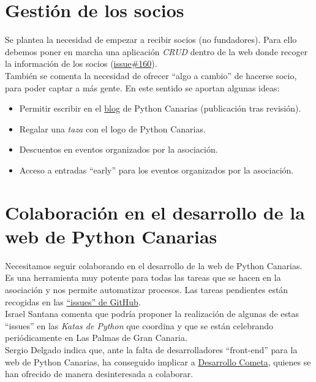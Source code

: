 \documentclass[a4paper, 12pt]{article}
\begin{document}
\section{Gestión de los socios}

Se plantea la necesidad de empezar a recibir socios (no fundadores). Para ello debemos poner en marcha una aplicación \textit{CRUD} dentro de la web donde recoger la información de los socios (\href{https://github.com/pythoncanarias/web/issues/160}{issue\#160}).\\

También se comenta la necesidad de ofrecer ``algo a cambio'' de hacerse socio, para poder captar a más gente. En este sentido se aportan algunas ideas:

\begin{itemize}
    \item Permitir escribir en el \href{https://medium.com/pythoncanarias}{blog} de Python Canarias (publicación tras revisión).
    \item Regalar una \textit{taza} con el logo de Python Canarias.
    \item Descuentos en eventos organizados por la asociación.
    \item Acceso a entradas ``early'' para los eventos organizados por la asociación.
\end{itemize}

\section{Colaboración en el desarrollo de la web de Python Canarias}

Necesitamos seguir colaborando en el desarrollo de la web de Python Canarias. Es una herramienta muy potente para todas las tareas que se hacen en la asociación y nos permite automatizar procesos. Las tareas pendientes están recogidas en las \href{https://github.com/pythoncanarias/web/issues}{``issues'' de GitHub}.\\

Israel Santana comenta que podría proponer la realización de algunas de estas ``issues'' en las \textit{Katas de Python} que coordina y que se están celebrando periódicamente en Las Palmas de Gran Canaria.\\

Sergio Delgado indica que, ante la falta de desarrolladores ``front-end'' para la web de Python Canarias, ha conseguido implicar a \href{https://www.desarrollocometa.com/}{Desarrollo Cometa}, quienes se han ofrecido de manera desinteresada a colaborar.
\end{document}
